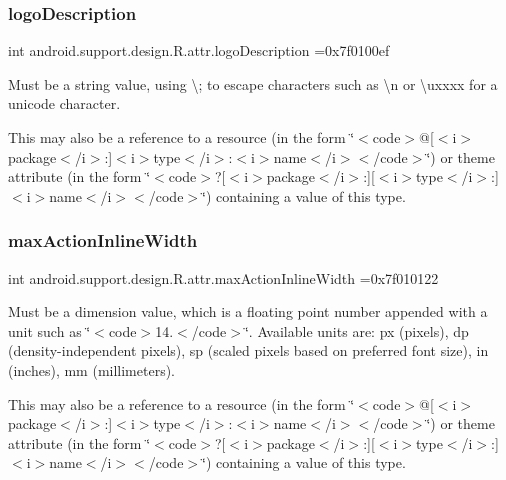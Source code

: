 \subsubsection{\texorpdfstring{logo\+Description}{logoDescription}}
{\footnotesize\ttfamily int android.\+support.\+design.\+R.\+attr.\+logo\+Description =0x7f0100ef\hspace{0.3cm}{\ttfamily [static]}}

Must be a string value, using \textquotesingle{}\textbackslash{};\textquotesingle{} to escape characters such as \textquotesingle{}\textbackslash{}n\textquotesingle{} or \textquotesingle{}\textbackslash{}uxxxx\textquotesingle{} for a unicode character. 

This may also be a reference to a resource (in the form \char`\"{}$<$code$>$@\mbox{[}$<$i$>$package$<$/i$>$\+:\mbox{]}$<$i$>$type$<$/i$>$\+:$<$i$>$name$<$/i$>$$<$/code$>$\char`\"{}) or theme attribute (in the form \char`\"{}$<$code$>$?\mbox{[}$<$i$>$package$<$/i$>$\+:\mbox{]}\mbox{[}$<$i$>$type$<$/i$>$\+:\mbox{]}$<$i$>$name$<$/i$>$$<$/code$>$\char`\"{}) containing a value of this type. \mbox{\label{classandroid_1_1support_1_1design_1_1R_1_1attr_a77cee121956a85a6e6111ccdc6aa4087}} 
\subsubsection{\texorpdfstring{max\+Action\+Inline\+Width}{maxActionInlineWidth}}
{\footnotesize\ttfamily int android.\+support.\+design.\+R.\+attr.\+max\+Action\+Inline\+Width =0x7f010122\hspace{0.3cm}{\ttfamily [static]}}

Must be a dimension value, which is a floating point number appended with a unit such as \char`\"{}$<$code$>$14.\+5sp$<$/code$>$\char`\"{}. Available units are\+: px (pixels), dp (density-\/independent pixels), sp (scaled pixels based on preferred font size), in (inches), mm (millimeters). 

This may also be a reference to a resource (in the form \char`\"{}$<$code$>$@\mbox{[}$<$i$>$package$<$/i$>$\+:\mbox{]}$<$i$>$type$<$/i$>$\+:$<$i$>$name$<$/i$>$$<$/code$>$\char`\"{}) or theme attribute (in the form \char`\"{}$<$code$>$?\mbox{[}$<$i$>$package$<$/i$>$\+:\mbox{]}\mbox{[}$<$i$>$type$<$/i$>$\+:\mbox{]}$<$i$>$name$<$/i$>$$<$/code$>$\char`\"{}) containing a value of this type. \mbox{\label{classandroid_1_1support_1_1design_1_1R_1_1attr_ae523ae984ac6bb23a26b52ddf3657fb7}} 
